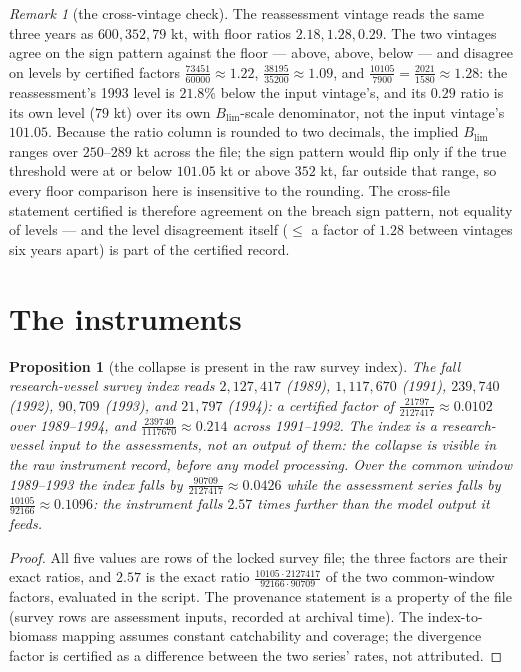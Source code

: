 \documentclass[10pt,twocolumn]{article}
\theoremstyle{plain}
\newtheorem{proposition}[theorem]{Proposition}
\theoremstyle{remark}
\newtheorem{remark}[theorem]{Remark}
\begin{document}
\begin{remark}[the cross-vintage check]\label{rem:xtevintage}
The reassessment vintage reads the same three years as
\(600, 352, 79\) kt, with floor ratios \(2.18, 1.28, 0.29\). The two
vintages agree on the sign pattern against the floor --- above, above,
below --- and disagree on levels by certified factors
\(\tfrac{73451}{60000} \approx 1.22\),
\(\tfrac{38195}{35200} \approx 1.09\), and
\(\tfrac{10105}{7900} = \tfrac{2021}{1580} \approx 1.28\): the
reassessment's 1993 level is \(21.8\%\) below the input vintage's, and
its \(0.29\) ratio is its own level (\(79\) kt) over its own
\(B_{\mathrm{lim}}\)-scale denominator, not the input vintage's
\(101.05\). Because the ratio column is rounded to two decimals, the
implied \(B_{\mathrm{lim}}\) ranges over \(250\)--\(289\) kt across
the file; the sign pattern would flip only if the true threshold were
at or below \(101.05\) kt or above \(352\) kt, far outside that range,
so every floor comparison here is insensitive to the rounding. The
cross-file statement certified is therefore agreement on the breach
sign pattern, not equality of levels --- and the level disagreement
itself (\(\le\) a factor of \(1.28\) between vintages six years
apart) is part of the certified record.
\end{remark}

\section{The instruments}\label{instruments}

\begin{proposition}[the collapse is present in the raw survey index]
\label{prop:survey}
The fall research-vessel survey index reads \(2{,}127{,}417\) (1989),
\(1{,}117{,}670\) (1991), \(239{,}740\) (1992), \(90{,}709\) (1993),
and \(21{,}797\) (1994): a certified factor of
\(\tfrac{21797}{2127417} \approx 0.0102\) over 1989--1994, and
\(\tfrac{239740}{1117670} \approx 0.214\) across 1991--1992. The index
is a research-vessel input to the assessments, not an output of them:
the collapse is visible in the raw instrument record, before any model
processing. Over the common window 1989--1993 the index falls by
\(\tfrac{90709}{2127417} \approx 0.0426\) while the assessment series
falls by \(\tfrac{10105}{92166} \approx 0.1096\): the instrument falls
\(2.57\) times further than the model output it feeds.
\end{proposition}

\begin{proof}
All five values are rows of the locked survey file; the three factors
are their exact ratios, and \(2.57\) is the exact ratio
\(\tfrac{10105 \cdot 2127417}{92166 \cdot 90709}\) of the two
common-window factors, evaluated in the script. The provenance
statement is a property of the file (survey rows are assessment
inputs, recorded at archival time). The index-to-biomass mapping
assumes constant catchability and coverage; the divergence factor is
certified as a difference between the two series' rates, not attributed.
\end{proof}
\end{document}
